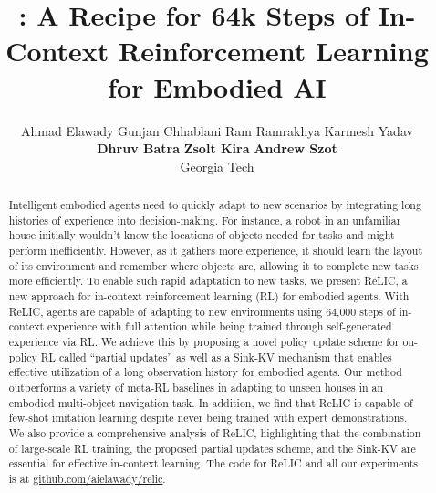 \documentclass{article}
\title{\method: A Recipe for 64k Steps of In-Context Reinforcement Learning for Embodied AI}
\author{
    Ahmad Elawady \quad
    Gunjan Chhablani \quad
    Ram Ramrakhya \quad
    Karmesh Yadav \quad \\
    \textbf{Dhruv Batra}  \quad
    \textbf{Zsolt Kira} \quad
    \textbf{Andrew Szot} \quad \\
    Georgia Tech
}
\newcommand{\method}{ReLIC\xspace}
\begin{document}
\maketitle
\begin{abstract}
 Intelligent embodied agents need to quickly adapt to new scenarios by integrating long histories of experience into decision-making. For instance, a robot in an unfamiliar house initially wouldn't know the locations of objects needed for tasks and might perform inefficiently. However, as it gathers more experience, it should learn the layout of its environment and remember where objects are, allowing it to complete new tasks more efficiently. To enable such rapid adaptation to new tasks, we present \method, a new approach for in-context reinforcement learning (RL) for embodied agents. With \method, agents are capable of adapting to new environments using 64,000 steps of in-context experience with full attention while being trained through self-generated experience via RL. We achieve this by proposing a novel policy update scheme for on-policy RL called ``partial updates'' as well as a Sink-KV mechanism that enables effective utilization of a long observation history for embodied agents. Our method outperforms a variety of meta-RL baselines in adapting to unseen houses in an embodied multi-object navigation task. In addition, we find that \method is capable of few-shot imitation learning despite never being trained with expert demonstrations. We also provide a comprehensive analysis of \method, highlighting that the combination of large-scale RL training, the proposed partial updates scheme, and the Sink-KV are essential for effective in-context learning.
The code for \method and all our experiments is at \href{https://github.com/aielawady/relic}{github.com/aielawady/relic}.
\end{abstract}
\end{document}
